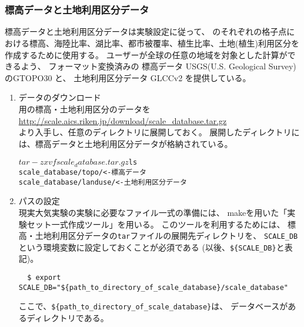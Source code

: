  \\
\\


\subsubsection{標高データと土地利用区分データ}
標高データと土地利用区分データは実験設定に従って、
\scalerm のそれぞれの格子点における標高、海陸比率、湖比率、都市被覆率、植生比率、土地(植生)利用区分を
作成するために使用する。
ユーザーが全球の任意の地域を対象とした計算ができるよう、
フォーマット変換済みの
標高データ USGS(U.S. Geological Survey) のGTOPO30 と、
土地利用区分データ GLCCv2 を提供している。

\begin{enumerate}
\item データのダウンロード\\
\scalerm 用の標高・土地利用区分のデータを\\
 \url{http://scale.aics.riken.jp/download/scale_database.tar.gz}\\
より入手し、任意のディレクトリに展開しておく。
展開したディレクトリには、標高データと土地利用区分データが格納されている。
\begin{alltt}
  $ tar -zxvf scale_database.tar.gz
  $ ls 
    scale_database/topo/    <- 標高データ
    scale_database/landuse/ <- 土地利用区分データ
\end{alltt}

\item パスの設定\\
現実大気実験の実験に必要なファイル一式の準備には、
makeを用いた「実験セット一式作成ツール」を用いる。
このツールを利用するためには、
標高・土地利用区分データの\verb|tar|ファイルの展開先ディレクトリを、
\verb|SCALE_DB| という環境変数に設定しておくことが必須である (以後、\verb|${SCALE_DB}|と表記)。
\begin{verbatim}
  $ export SCALE_DB="${path_to_directory_of_scale_database}/scale_database"
\end{verbatim}
ここで、\verb|${path_to_directory_of_scale_database}|は、
データベースがあるディレクトリである。
\end{enumerate}



